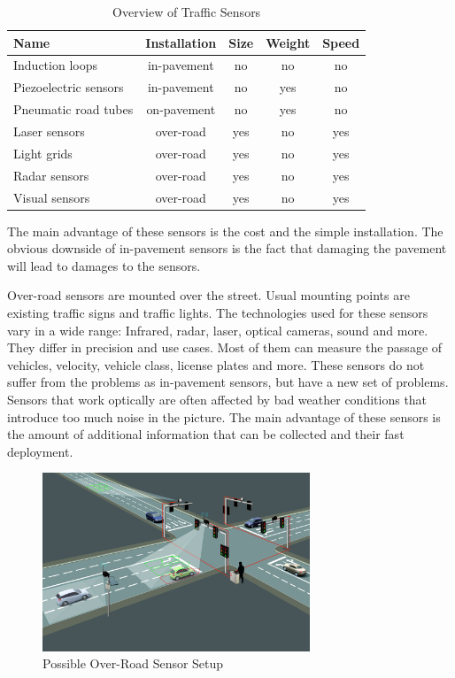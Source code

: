 \begin{table}[hb!]
	\centering
	\begin{tabular}{l|c|c|c|c}
		Name & Installation & Size & Weight & Speed \\
		\hline\hline
		Induction loops & in-pavement & no & no & no \\
		Piezoelectric sensors & in-pavement & no & yes & no \\
		Pneumatic road tubes & on-pavement & no & yes & no \\
		Laser sensors & over-road & yes & no & yes \\
		Light grids & over-road & yes & no & yes \\
		Radar sensors & over-road & yes & no & yes \\
		Visual sensors & over-road & yes & no & yes \\
	\end{tabular}
	\caption{Overview of Traffic Sensors}
	\label{sensor_overview}
\end{table}

The main advantage of these sensors is the cost and the simple installation. The obvious downside of in-pavement sensors is the fact that damaging the pavement will lead to damages to the sensors.

Over-road sensors are mounted over the street. Usual mounting points are existing traffic signs and traffic lights. The technologies used for these sensors vary in a wide range: Infrared, radar, laser, optical cameras, sound and more. They differ in precision and use cases. Most of them can measure the passage of vehicles, velocity, vehicle class, license plates and more. These sensors do not suffer from the problems as in-pavement sensors, but have a new set of problems. Sensors that work optically are often affected by bad weather conditions that introduce too much noise in the picture. The main advantage of these sensors is the amount of additional information that can be collected and their fast deployment. \cite{tdh}

\begin{figure}[ht]
	\centering
	\includegraphics[width=8cm]{figures/overroad-sensor}
	\caption{Possible Over-Road Sensor Setup}
	\label{overroad-sensor}
\end{figure}

